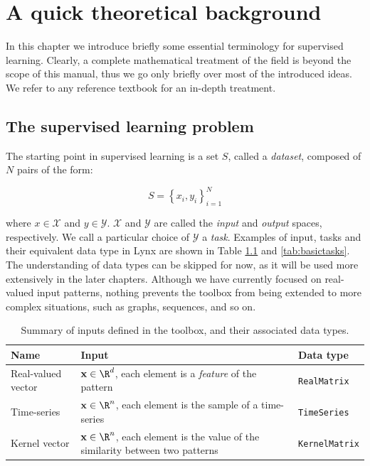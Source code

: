 \chapter{A quick theoretical background}
\label{chap:theoreticalbackground}

In this chapter we introduce briefly some essential terminology for supervised learning. Clearly, a complete mathematical treatment of the field is beyond the scope of this manual, thus we go only briefly over most of the introduced ideas. We refer to any reference textbook for an in-depth treatment.\cite{alpaydin2004introduction,Friedman2009,Mohri2012}

\section{The supervised learning problem}

The starting point in supervised learning is a set $S$, called a \textit{dataset}, composed of $N$ pairs of the form:

\begin{equation}
S = \left\{ x_i, y_i \right\}_{i=1}^N
\label{eq:dataset}
\end{equation}

\noindent where $x \in \mathcal{X}$ and $y \in \mathcal{Y}$. $\mathcal{X}$ and $\mathcal{Y}$ are called the \textit{input} and \textit{output} spaces, respectively.  We call a particular choice of $\mathcal{Y}$ a \textit{task}. Examples of input, tasks and their equivalent data type in Lynx are shown in Table \ref{tab:basicinputs} and \ref{tab:basictasks}. The understanding of data types can be skipped for now, as it will be used more extensively in the later chapters. Although we have currently focused on real-valued input patterns, nothing prevents the toolbox from being extended to more complex situations, such as graphs, sequences, and so on.

\vspace{-2em}

\begin{center}
\begin{table}[t]
{\centering\hfill{}
\begin{tabular}{p{}p{}p{}}
\toprule
Name & Input & Data type \\ 
\midrule
Real-valued vector & $\vect{x} \in \R^{d}$, each element is a \textit{feature} of the pattern & \verb|RealMatrix|  \\
Time-series & $\vect{x} \in \R^n$, each element is the sample of a time-series & \verb|TimeSeries| \\
Kernel vector &  $\vect{x} \in \R^n$, each element is the value of the similarity between two patterns & \verb|KernelMatrix| \\
\bottomrule
\end{tabular}}
\hfill{}
\caption{Summary of inputs defined in the toolbox, and their associated data types.}
\label{tab:basicinputs}
\end{table}
\end{center}

